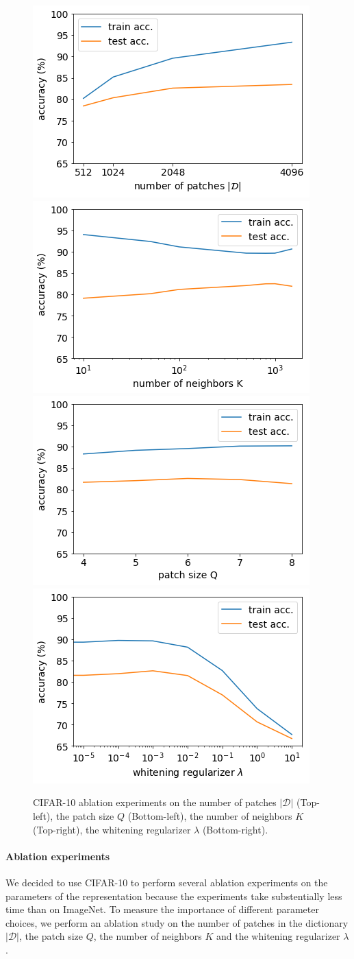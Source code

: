 \documentclass{article}
\begin{document}
{\begin{figure} 
  \label{fig:ablation_study}
  \centering
   \includegraphics[width=0.45\linewidth]{figures/albation_study_npatches.png}
  \includegraphics[width=0.45\linewidth]{figures/albation_study_K.png}
  \includegraphics[width=0.45\linewidth]{figures/albation_study_Q.png}
  \includegraphics[width=0.45\linewidth]{figures/albation_study_lambda.png}\\
  \caption{CIFAR-10 ablation experiments on the number of patches  $|\mathcal{D}|$ (Top-left), the patch size $Q$ (Bottom-left), the number of neighbors $K$ (Top-right), the whitening regularizer $\lambda$ (Bottom-right).}
\end{figure}




\paragraph{Ablation experiments}
We decided to use CIFAR-10 to perform several ablation experiments on the parameters of the representation because the experiments take substentially less time than on ImageNet. To measure the importance of different parameter choices, we perform an ablation study on the number of patches in the dictionary $|\mathcal{D}|$, the patch size $Q$, the number of neighbors $K$ and the whitening regularizer $\lambda$.


}
\end{document}
